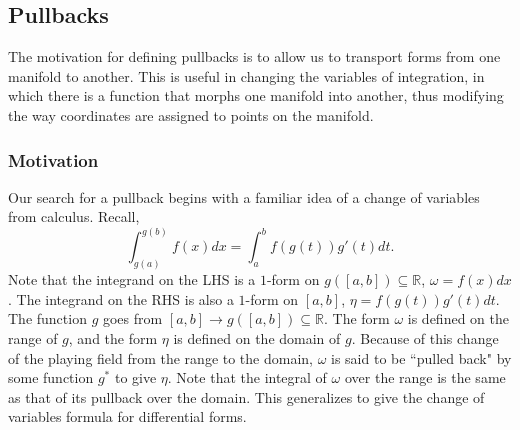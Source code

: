 \documentclass{article}
\theoremstyle{definition}
\theoremstyle{named}
\begin{document}
\subsection{Pullbacks}
The motivation for defining pullbacks is to allow us to transport forms from one manifold to another. This is useful in changing the variables of integration, in which there is a function that morphs one manifold into another, thus modifying the way coordinates are assigned to points on the manifold.

\subsubsection{Motivation}
Our search for a pullback begins with a familiar idea of a change of variables from calculus. Recall,
\[
    \int_{g(a)}^{g(b)} f(x) dx = \int_a^b f(g(t)) g'(t) dt .
\]
Note that the integrand on the LHS is a $1$-form on $g([a, b]) \subseteq \mathbb{R}$, $\omega = f(x) dx$. The integrand on the RHS is also a $1$-form on $[a, b]$, $\eta = f(g(t)) g'(t) dt$. The function $g$ goes from $[a, b] \to g([a, b]) \subseteq \mathbb{R}$. The form $\omega$ is defined on the range of $g$, and the form $\eta$ is defined on the domain of $g$. Because of this change of the playing field from the range to the domain, $\omega$ is said to be ``pulled back" by some function $g^*$ to give $\eta$. Note that the integral of $\omega$ over the range is the same as that of its pullback over the domain. This generalizes to give the change of variables formula for differential forms.
\end{document}
